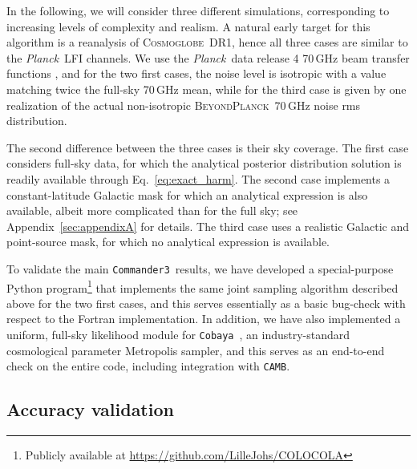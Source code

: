 \documentclass[twocolumn]{../common/aa}
\def\planck{\emph{Planck}}
\def\Planck{\emph{Planck}}
\def\commanderthree{\texttt{Commander3}}
\def\cobaya{\texttt{Cobaya}}
\def\camb{\texttt{CAMB}}
\newcommand{\BP}{\textsc{BeyondPlanck}}
\newcommand{\cosmoglobe}{\textsc{Cosmoglobe}}
\begin{document}
In the following, we will consider three different simulations, corresponding to increasing levels of complexity and realism. A natural early target for this algorithm is a reanalysis of \cosmoglobe\ DR1, hence all three cases are similar to the \Planck\ LFI channels. We use the \planck\ data release 4 70\,GHz beam transfer functions \citep{planck2020-LVII}, and for the two first cases, the noise level is isotropic with a value matching twice the full-sky 70\,GHz mean, while for the third case is given by one realization of the actual non-isotropic \BP\ 70\,GHz noise rms distribution.

The second difference between the three cases is their sky coverage. The first case considers full-sky data, for which the analytical posterior distribution solution is readily available through Eq.~\eqref{eq:exact_harm}. The second case implements a constant-latitude Galactic mask for which an analytical expression is also available, albeit more complicated than for the full sky; see Appendix~\ref{sec:appendixA} for details. The third case uses a realistic Galactic and point-source mask, for which no analytical expression is available. 

To validate the main \commanderthree\ results, we have developed a special-purpose Python program\footnote{Publicly available at \url{https://github.com/LilleJohs/COLOCOLA}} that implements the same joint sampling algorithm described above for the two first cases, and this serves essentially as a basic bug-check with respect to the Fortran implementation. In addition, we have also implemented a uniform, full-sky likelihood module for \cobaya\ \citep{Torrado:2020dgo}, an industry-standard cosmological parameter Metropolis sampler, and this serves as an end-to-end check on the entire code, including integration with \camb.

\subsection{Accuracy validation}
\end{document}
